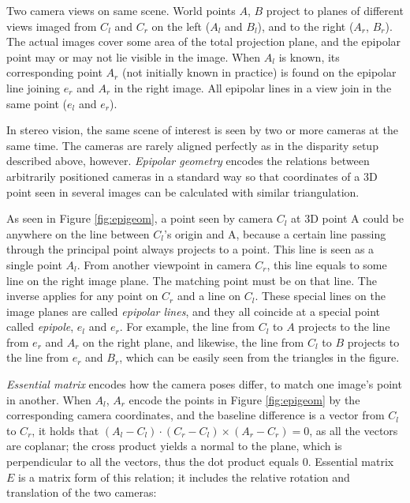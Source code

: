 {Two camera views on same scene.
World points $A$, $B$ project to planes of different views imaged from $C_l$ and $C_r$ on the left ($A_l$ and $B_l$), and to the right ($A_r$, $B_r$).
The actual images cover some area of the total projection plane, and the epipolar point may or may not lie visible in the image.
When $A_l$ is known, its corresponding point $A_r$ (not initially known in practice) is found on the epipolar line joining $e_r$ and $A_r$ in the right image.
All epipolar lines in a view join in the same point ($e_l$ and $e_r$).}


In stereo vision, the same scene of interest is seen by two or more cameras at the same time.
The cameras are rarely aligned perfectly as in the disparity setup described above, however.
\emph{Epipolar geometry} encodes the relations between arbitrarily positioned cameras in a standard way so that coordinates of a 3D point seen in several images can be calculated with similar triangulation.

As seen in Figure \ref{fig:epigeom}, a point seen by camera $C_l$ at 3D point A could be anywhere on the line between $C_l$'s origin and A, because a certain line passing through the principal point always projects to a point.
This line is seen as a single point $A_l$.
From another viewpoint in camera $C_r$, this line equals to some line on the right image plane.
The matching point must be on that line.
The inverse applies for any point on $C_r$ and a line on $C_l$.
These special lines on the image planes are called \emph{epipolar lines}, and they all coincide at a special point called \emph{epipole}, $e_l$ and $e_r$.
For example, the line from $C_l$ to $A$ projects to the line from $e_r$ and $A_r$ on the right plane, and likewise, the line from $C_l$ to $B$ projects to the line from $e_r$ and $B_r$, which can be easily seen from the triangles in the figure.

\emph{Essential matrix} encodes how the camera poses differ, to match one image's point in another.
When $A_l$, $A_r$ encode the points in Figure \ref{fig:epigeom} by the corresponding camera coordinates, and the baseline difference is a vector from $C_l$ to $C_r$, it holds that $(A_l-C_l) \cdot (C_r - C_l) \times (A_r-C_r) = 0$, as all the vectors are coplanar; the cross product yields a normal to the plane, which is perpendicular to all the vectors, thus the dot product equals 0.
\cite{hartley03multiview}
Essential matrix $E$ is a matrix form of this relation; it includes the relative rotation and translation of the two cameras:

